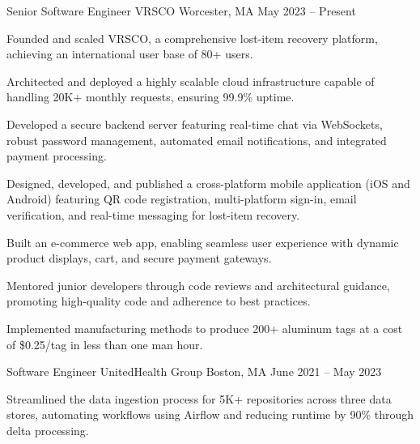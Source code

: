 

\begin{cventries}

  \cventry
    {Senior Software Engineer} %
    {VRSCO} %
    {Worcester, MA} %
    {May 2023 – Present}
    {
      \begin{cvitems} %
          \item {Founded and scaled VRSCO, a comprehensive lost-item recovery platform, achieving an international user base of 80+ users.}
          \item {Architected and deployed a highly scalable cloud infrastructure capable of handling 20K+ monthly requests, ensuring 99.9\% uptime.}
          \item {Developed a secure backend server featuring real-time chat via WebSockets, robust password management, automated email notifications, and integrated payment processing.}
          \item {Designed, developed, and published a cross-platform mobile application (iOS and Android) featuring QR code registration, multi-platform sign-in, email verification, and real-time messaging for lost-item recovery.}
          \item {Built an e-commerce web app, enabling seamless user experience with dynamic product displays, cart, and secure payment gateways.}
          \item {Mentored junior developers through code reviews and architectural guidance, promoting high-quality code and adherence to best practices.}
          \item {Implemented manufacturing methods to produce 200+ aluminum tags at a cost of \$0.25/tag in less than one man hour.}
      \end{cvitems}
    }
  \cventry
    {Software Engineer} %
    {UnitedHealth Group} %
    {Boston, MA} %
    {June 2021 – May 2023} %
    {
      \begin{cvitems} %
        \item {Streamlined the data ingestion process for 5K+ repositories across three data stores, automating workflows using Airflow and reducing runtime by 90\% through delta processing.}

\end{cvitems}}
\end{cventries}
